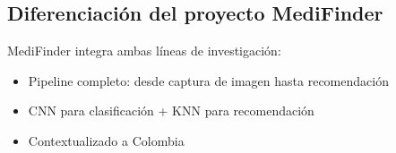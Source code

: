 \subsection{Diferenciación del proyecto MediFinder}

MediFinder integra ambas líneas de investigación:

\begin{itemize}
	\item Pipeline completo: desde captura de imagen hasta recomendación
	\item CNN para clasificación + KNN para recomendación
	\item Contextualizado a Colombia
\end{itemize}

\pagebreak